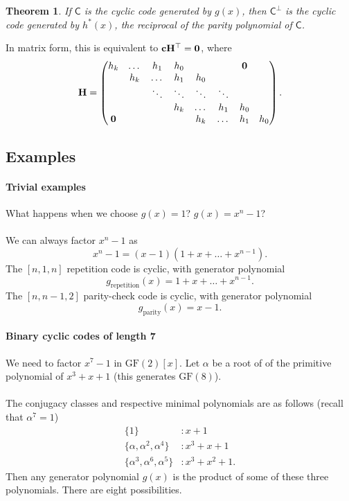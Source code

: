 \documentclass[a4paper, 11pt, openany]{book}
\numberwithin{equation}{section}
\theoremstyle{plain}
\newtheorem{theorem}	[equation]	{Theorem}
\theoremstyle{definition}
\newcommand{\GF}{\mathrm{GF}}
\newcommand{\code}[1]{\mathsf{#1}}
\begin{document}
\begin{theorem} 
If $\code{C}$ is the cyclic code generated by $g(x)$, then $\code{C}^\perp$ is the cyclic code generated by $h^*(x)$, the reciprocal of the parity polynomial of $\code{C}$.
\end{theorem}

In matrix form, this is equivalent to ${\bf c} {\bf H}^\top = {\bf 0}$, where
\[
	{\bf H} = \begin{pmatrix}
	h_k		& \dots	& h_1 		& h_0		& 			& 			& {\bf 0}\\
			& h_k	& \dots		& h_1	 	& h_0 		& 			& 		& \\
			&    	& \ddots 	& \ddots 	& \ddots 	& \ddots 	& 		& \\
			& 		& 			& h_k		& \dots		& h_1		& h_0	& \\
	{\bf 0}	& 		& 			&			& h_k		& \dots		& h_1	& h_0 
	\end{pmatrix}.
\]






\subsection{Examples}

\paragraph{Trivial examples}
What happens when we choose $g(x) = 1$? $g(x) = x^n - 1$?\\
~\\
We can always factor $x^n-1$ as
\[
	x^n - 1 = (x-1)(1 + x + \dots + x^{n-1}).
\]
The $[n,1,n]$ repetition code is cyclic, with generator polynomial 
\[
	g_{\mathrm{repetition}}(x) = 1 + x + \dots + x^{n-1}.
\]
The $[n,n-1,2]$ parity-check code is cyclic, with generator polynomial 
\[
	g_{\mathrm{parity}}(x) = x - 1.
\]



\paragraph{Binary cyclic codes of length 7}
We need to factor $x^7 - 1$ in $\GF(2)[x]$. Let $\alpha$ be a root of of the primitive polynomial of $x^3 + x + 1$ (this generates $\GF(8)$).\\
~\\
The conjugacy classes and respective minimal polynomials are as follows (recall that $\alpha^7 = 1$)
\begin{align*}
	\{1\} &: x + 1\\
	\{ \alpha, \alpha^2, \alpha^4\} &: x^3 + x + 1\\
	\{ \alpha^3, \alpha^6, \alpha^5\} &: x^3 + x^2 + 1.
\end{align*}
Then any generator polynomial $g(x)$ is the product of some of these three polynomials. There are eight possibilities.
\end{document}
